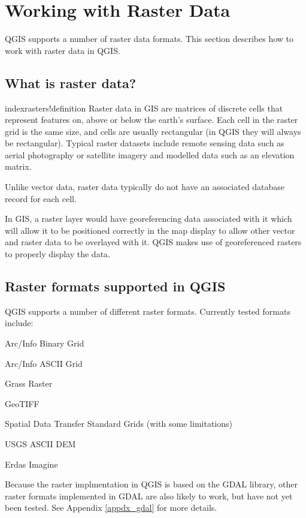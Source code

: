 \chapter{Working with Raster Data}
QGIS supports a number of raster data formats. This section describes how to work with raster data in QGIS.
\section{What is raster data?}
index{rasters!definition}
Raster data in GIS are matrices of discrete cells that represent features on, above or below the earth's surface. Each cell in the raster grid is the same size, and cells are usually rectangular (in QGIS they will always be rectangular). Typical raster datasets include remote sensing data such as aerial photography or satellite imagery and modelled data such as an elevation matrix.

Unlike vector data, raster data typically do not have an associated database record for each cell.

In GIS, a raster layer would have georeferencing data associated with it which
will allow it to be positioned correctly in the map display to allow other
vector and raster data to be overlayed with it. QGIS makes use of georeferenced
rasters to properly display the data.
	
\section{Raster formats supported in QGIS}
QGIS supports a number of different raster formats. Currently tested formats
include:
\begin{compactitem}
\item Arc/Info Binary Grid
\item Arc/Info ASCII Grid
\item Grass Raster
\item GeoTIFF
\item Spatial Data Transfer Standard Grids (with some limitations)
\item USGS ASCII DEM
\item Erdas Imagine
\end{compactitem}
Because the raster implmentation in QGIS is based on the GDAL library, other
raster formats implemented in GDAL are also likely to work, but have not yet
been tested. See Appendix \ref{appdx_gdal} for more
details.
	
